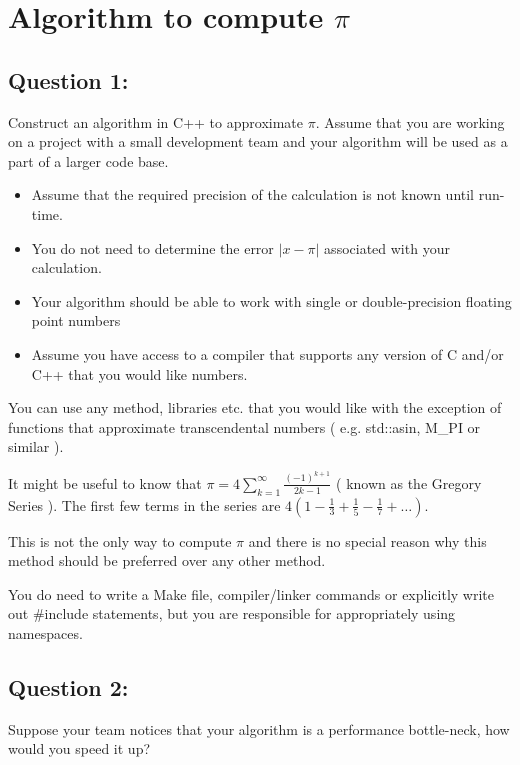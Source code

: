 \documentclass[letterpaper,11pt]{article}
\begin{document}

\section*{Algorithm to compute  $\pi$}

\subsection*{Question 1:}

Construct an algorithm in C++ to approximate $\pi$. Assume that you are working on a project
 with a small development team and your algorithm will be used
 as a part of a larger code base.

\begin{itemize}
  \item Assume that the required precision of the calculation is not known until run-time.
  \item You do not need to determine the error $\lvert x - \pi \rvert$ associated with
   your calculation.
  \item Your algorithm should be able to work with single or double-precision floating point numbers
  \item Assume you have access to a compiler that supports any version of C and/or C++ that you would like
  numbers.
\end{itemize}

You can use any method, libraries etc. that you would
like with the exception of functions that approximate transcendental numbers ( e.g.
 std::asin, M\_PI or similar ).

It might be useful to know that $\pi = 4 \sum_{k=1}^{\infty} \frac{ (-1)^{k+1} }{ 2k - 1 }$
( known as the Gregory Series ). The first few terms in the series are $
4( 1 - \frac{1}{3} + \frac{1}{5} - \frac{1}{7} + \dots )$.

This is not the only way to compute $\pi$ and there is no special reason why this
 method should be preferred over any other method.

You do need to write a Make file, compiler/linker commands or
explicitly write out \#include statements, but you are responsible for appropriately
  using namespaces.

\subsection*{Question 2:}

Suppose your team notices that your algorithm is a performance bottle-neck,
how would you speed it up?
\end{document}
